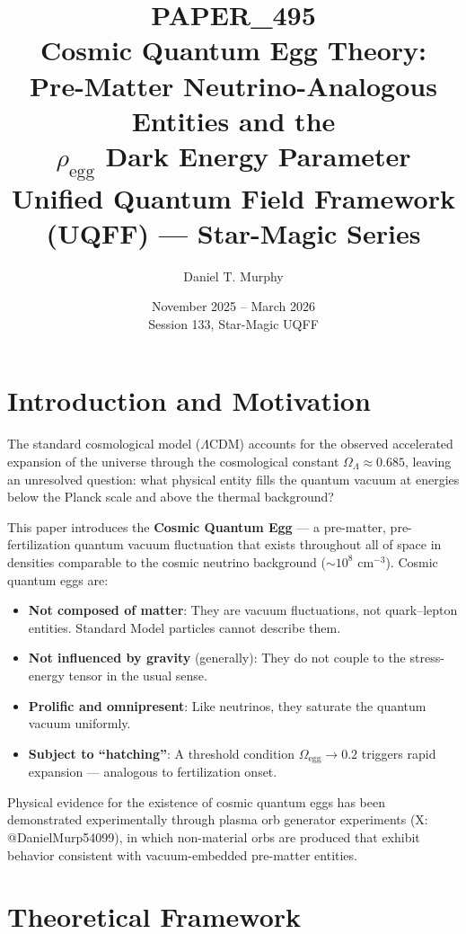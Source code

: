 \documentclass[12pt]{article}
\title{%
    \textbf{PAPER\_495} \\[6pt]
    \Large Cosmic Quantum Egg Theory: \\
    Pre-Matter Neutrino-Analogous Entities and the \\
    $\rho_\text{egg}$ Dark Energy Parameter \\[4pt]
    \normalsize Unified Quantum Field Framework (UQFF) — Star-Magic Series
}
\author{Daniel T. Murphy}
\date{November 2025 -- March 2026 \\ \small Session 133, Star-Magic UQFF}
\begin{document}
\maketitle
\tableofcontents
\newpage

\section{Introduction and Motivation}

The standard cosmological model ($\Lambda$CDM) accounts for the observed
accelerated expansion of the universe through the cosmological constant
$\Omega_\Lambda \approx 0.685$, leaving an unresolved question: what physical
entity fills the quantum vacuum at energies below the Planck scale and above
the thermal background?

This paper introduces the \textbf{Cosmic Quantum Egg} --- a pre-matter,
pre-fertilization quantum vacuum fluctuation that exists throughout all of
space in densities comparable to the cosmic neutrino background
($\sim$$10^8$ cm$^{-3}$). Cosmic quantum eggs are:

\begin{itemize}
    \item \textbf{Not composed of matter}: They are vacuum fluctuations, not
          quark--lepton entities. Standard Model particles cannot describe them.
    \item \textbf{Not influenced by gravity} (generally): They do not couple
          to the stress-energy tensor in the usual sense.
    \item \textbf{Prolific and omnipresent}: Like neutrinos, they saturate the
          quantum vacuum uniformly.
    \item \textbf{Subject to ``hatching''}: A threshold condition
          $\Omega_\text{egg} \to 0.2$ triggers rapid expansion --- analogous to
          fertilization onset.
\end{itemize}

Physical evidence for the existence of cosmic quantum eggs has been
demonstrated experimentally through plasma orb generator experiments
(X: @DanielMurp54099), in which non-material orbs are produced that exhibit
behavior consistent with vacuum-embedded pre-matter entities.

\section{Theoretical Framework}
\end{document}
